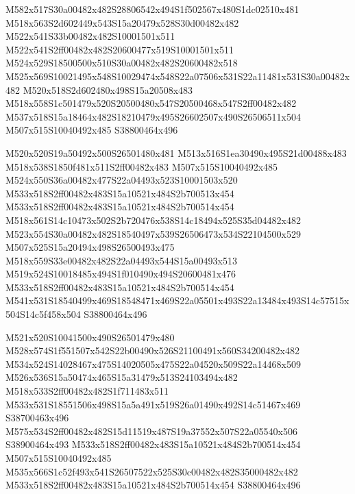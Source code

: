 \documentclass{article}
\begin{document}
\begin{multicols}{2}
M582x517S30a00482x482S28806542x494S1f502567x480S1dc02510x481 M518x563S2d602449x543S15a20479x528S30d00482x482 M522x541S33b00482x482S10001501x511 M522x541S2ff00482x482S20600477x519S10001501x511 M524x529S18500500x510S30a00482x482S20600482x518 M525x569S10021495x548S10029474x548S22a07506x531S22a11481x531S30a00482x482 M520x518S2d602480x498S15a20508x483 M518x558S1c501479x520S20500480x547S20500468x547S2ff00482x482 M537x518S15a18464x482S18210479x495S26602507x490S26506511x504 M507x515S10040492x485 S38800464x496

M520x520S19a50492x500S26501480x481 M513x516S1ea30490x495S21d00488x483 M518x538S1850f481x511S2ff00482x483 M507x515S10040492x485 M524x550S36a00482x477S22a04493x523S10001503x520 M533x518S2ff00482x483S15a10521x484S2b700513x454 M533x518S2ff00482x483S15a10521x484S2b700514x454 M518x561S14c10473x502S2b720476x538S14c18494x525S35d04482x482 M523x554S30a00482x482S18540497x539S26506473x534S22104500x529 M507x525S15a20494x498S26500493x475 M518x559S33e00482x482S22a04493x544S15a00493x513 M519x524S10018485x494S1f010490x494S20600481x476 M533x518S2ff00482x483S15a10521x484S2b700514x454 M541x531S18540499x469S18548471x469S22a05501x493S22a13484x493S14c57515x504S14c5f458x504 S38800464x496

M521x520S10041500x490S26501479x480 M528x574S1f551507x542S22b00490x526S21100491x560S34200482x482 M534x524S14028467x475S14020505x475S22a04520x509S22a14468x509 M526x536S15a50474x465S15a31479x513S24103494x482 M518x533S2ff00482x482S1f711483x511 M533x531S18551506x498S15a5a491x519S26a01490x492S14c51467x469 S38700463x496 M575x534S2ff00482x482S15d11519x487S19a37552x507S22a05540x506 S38900464x493 M533x518S2ff00482x483S15a10521x484S2b700514x454 M507x515S10040492x485 M535x566S1c52f493x541S26507522x525S30c00482x482S35000482x482 M533x518S2ff00482x483S15a10521x484S2b700514x454 S38800464x496


\end{multicols}
\end{document}
